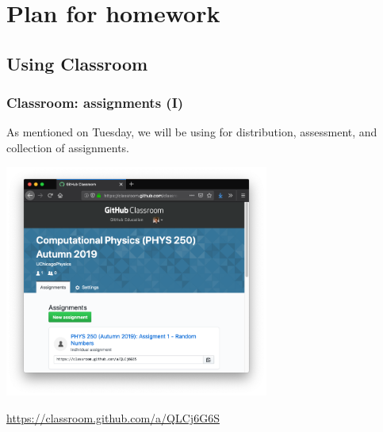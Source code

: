 \documentclass[hyperref={colorlinks=true}]{beamer}
\begin{document}
\section[Plan for homework]{Plan for homework}

\subsection[Using \github Classroom]{Using \github Classroom}


\begin{frame}%
  \frametitle{\github Classroom: assignments (I)}
  
  As mentioned on Tuesday, we will be using \github for distribution, assessment, and collection of assignments. 
  
  \begin{center}
    \includegraphics[width=0.65\textwidth]{GitHubClassroom-Assignment1.png}
  \end{center}
  
  \vspace{-1cm}
  
  \centering \url{https://classroom.github.com/a/QLCj6G6S}

\end{frame}

\end{document}
